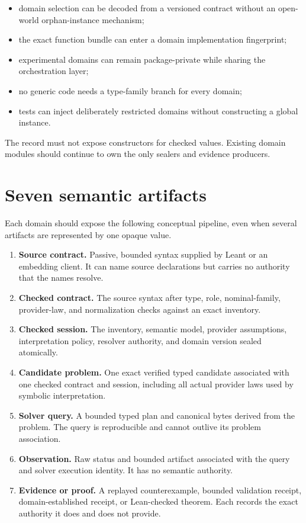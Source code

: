 \documentclass[11pt,oneside]{report}
\begin{document}
\begin{itemize}[leftmargin=2em]
\item domain selection can be decoded from a versioned contract without an open-world orphan-instance mechanism;
\item the exact function bundle can enter a domain implementation fingerprint;
\item experimental domains can remain package-private while sharing the orchestration layer;
\item no generic code needs a type-family branch for every domain;
\item tests can inject deliberately restricted domains without constructing a global instance.
\end{itemize}

The record must not expose constructors for checked values. Existing domain modules should continue to own the only sealers and evidence producers.

\section{Seven semantic artifacts}

Each domain should expose the following conceptual pipeline, even when several artifacts are represented by one opaque value.

\begin{enumerate}[leftmargin=2em]
\item \textbf{Source contract.} Passive, bounded syntax supplied by Leant or an embedding client. It can name source declarations but carries no authority that the names resolve.
\item \textbf{Checked contract.} The source syntax after type, role, nominal-family, provider-law, and normalization checks against an exact inventory.
\item \textbf{Checked session.} The inventory, semantic model, provider assumptions, interpretation policy, resolver authority, and domain version sealed atomically.
\item \textbf{Candidate problem.} One exact verified typed candidate associated with one checked contract and session, including all actual provider laws used by symbolic interpretation.
\item \textbf{Solver query.} A bounded typed plan and canonical bytes derived from the problem. The query is reproducible and cannot outlive its problem association.
\item \textbf{Observation.} Raw status and bounded artifact associated with the query and solver execution identity. It has no semantic authority.
\item \textbf{Evidence or proof.} A replayed counterexample, bounded validation receipt, domain-established receipt, or Lean-checked theorem. Each records the exact authority it does and does not provide.
\end{enumerate}
\end{document}
